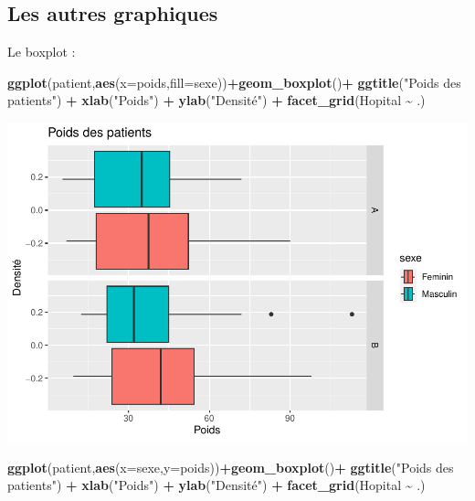 \documentclass[
]{book}
\newenvironment{Shaded}{\begin{snugshade}}{\end{snugshade}}
\newcommand{\AttributeTok}[1]{\textcolor[rgb]{0.13,0.29,0.53}{#1}}
\newcommand{\FunctionTok}[1]{\textcolor[rgb]{0.13,0.29,0.53}{\textbf{#1}}}
\newcommand{\NormalTok}[1]{#1}
\newcommand{\SpecialCharTok}[1]{\textcolor[rgb]{0.81,0.36,0.00}{\textbf{#1}}}
\newcommand{\StringTok}[1]{\textcolor[rgb]{0.31,0.60,0.02}{#1}}
\begin{document}
\hypertarget{les-autres-graphiques}{%
\subsection{Les autres graphiques}\label{les-autres-graphiques}}

Le boxplot :

\begin{Shaded}
\begin{Highlighting}[]
\FunctionTok{ggplot}\NormalTok{(patient,}\FunctionTok{aes}\NormalTok{(}\AttributeTok{x=}\NormalTok{poids,}\AttributeTok{fill=}\NormalTok{sexe))}\SpecialCharTok{+}\FunctionTok{geom\_boxplot}\NormalTok{()}\SpecialCharTok{+}
  \FunctionTok{ggtitle}\NormalTok{(}\StringTok{"Poids des patients"}\NormalTok{) }\SpecialCharTok{+} 
  \FunctionTok{xlab}\NormalTok{(}\StringTok{"Poids"}\NormalTok{) }\SpecialCharTok{+} 
  \FunctionTok{ylab}\NormalTok{(}\StringTok{"Densité"}\NormalTok{) }\SpecialCharTok{+}
  \FunctionTok{facet\_grid}\NormalTok{(Hopital }\SpecialCharTok{\textasciitilde{}}\NormalTok{ .)}
\end{Highlighting}
\end{Shaded}

\includegraphics{_main_files/figure-latex/ggplot12-1.pdf}

\begin{Shaded}
\begin{Highlighting}[]
\FunctionTok{ggplot}\NormalTok{(patient,}\FunctionTok{aes}\NormalTok{(}\AttributeTok{x=}\NormalTok{sexe,}\AttributeTok{y=}\NormalTok{poids))}\SpecialCharTok{+}\FunctionTok{geom\_boxplot}\NormalTok{()}\SpecialCharTok{+}
  \FunctionTok{ggtitle}\NormalTok{(}\StringTok{"Poids des patients"}\NormalTok{) }\SpecialCharTok{+} 
  \FunctionTok{xlab}\NormalTok{(}\StringTok{"Poids"}\NormalTok{) }\SpecialCharTok{+} 
  \FunctionTok{ylab}\NormalTok{(}\StringTok{"Densité"}\NormalTok{) }\SpecialCharTok{+}
  \FunctionTok{facet\_grid}\NormalTok{(Hopital }\SpecialCharTok{\textasciitilde{}}\NormalTok{ .)}
\end{Highlighting}
\end{Shaded}
\end{document}
